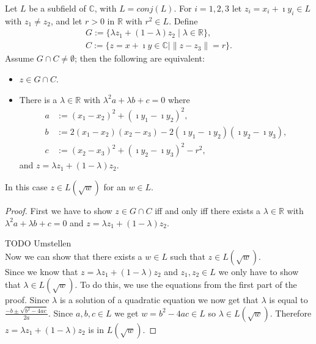 \begin{lemma}
    \label{lem:ConjClosed.Intersection_line_circle}
    Let $L$ be a subfield of $\mathbb{C}$, with $L = conj(L)$. For $i = 1,2,3$ let $z_i = x_i + \imath y_i \in L$ with $z_1 \ne z_2$, and let $r > 0$ in $\mathbb{R}$ with $r^2 \in L$. Define
    \begin{equation*}\begin{aligned}
        G := \{\lambda z_1 + (1-\lambda)z_2 \mid \lambda \in \mathbb{R}\},\\
        C := \{z = x + \imath y \in \mathbb{C} \mid \|z - z_3\| = r\}.
    \end{aligned} \end{equation*}
    Assume $G \cap C \ne \emptyset$; then the following are equivalent:
    \begin{itemize}
        \item $z\in G \cap C$.
        \item There is a $\lambda \in \mathbb{R}$ with $\lambda^2 a+ \lambda b + c = 0$ where
        \begin{align*}
            a &:= (x_1 - x_2)^2 + (\imath y_1 - \imath y_2)^2,\\
            b &:= 2(x_1 - x_2)(x_2 - x_3) - 2(\imath y_1 - \imath y_2)(\imath y_2 - \imath y_3),\\
            c &:= (x_2 - x_3)^2 + (\imath y_2 - \imath y_3)^2 - r^2,
        \end{align*}
        and $z = \lambda z_1 + (1-\lambda)z_2$.
    \end{itemize}
    In this case $z \in L(\sqrt{w})$ for an $w \in L$.
\end{lemma}

\begin{proof}
First we have to show $z \in G \cap C$ iff and only iff there exists a $\lambda \in \mathbb{R}$ with $\lambda^2 a+ \lambda b + c = 0$ and $z = \lambda z_1 + (1-\lambda)z_2$.

TODO Umstellen \\
Now we can show that there exists a $w \in L$ such that $z \in L(\sqrt{w})$.\\
Since we know that $z = \lambda z_1 + (1-\lambda)z_2$ and $z_1, z_2 \in L$ we only have to show that $\lambda \in L(\sqrt{w})$.
To do this, we use the equations from the first part of the proof. 
Since $\lambda$ is a solution of a quadratic equation we now get that $\lambda$ is equal to $\frac{-b \pm \sqrt{b^2 - 4ac}}{2a}$. Since $a,b,c \in L$ we get $w = b^2 - 4ac \in L$ so $\lambda \in L(\sqrt{w})$. Therefore $z = \lambda z_1 + (1-\lambda)z_2$ is in $L(\sqrt{w})$.
\end{proof}

